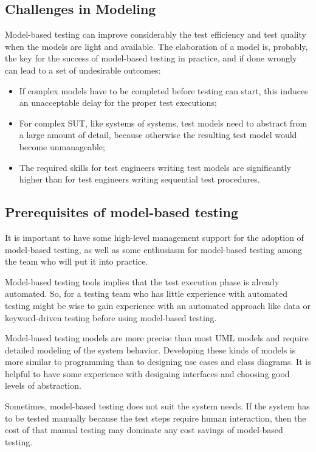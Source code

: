 \subsection{Challenges in Modeling}
Model-based testing can improve considerably the test 
efficiency and test quality when the models are light 
and available. The elaboration of a model is, probably, 
the key for the success of model-based testing in practice,
and if done wrongly~\cite{Peleska.2013} can lead to a set of undesirable 
outcomes:

\begin{itemize}
\item If complex models have to be completed before testing
can start, this induces an unacceptable delay for the
proper test executions;
\item For complex SUT, like systems of systems, test models 
need to abstract from a large amount of detail, because 
otherwise the resulting test model would become unmanageable;
\item The required skills for test engineers writing test 
models are significantly higher than for test engineers 
writing sequential test procedures.
\end{itemize}

\subsection{Prerequisites of model-based testing}

It is important to have some high-level management support for the adoption of model-based testing, as well as some enthusiasm for model-based testing among the team who will put it into practice.

Model-based testing tools implies that the test execution phase is already automated. So, for a testing team who has little experience with automated testing might be wise to gain experience with an automated approach like data or keyword-driven testing before using model-based testing.

Model-based testing models are more precise than most UML models and require detailed modeling of the system behavior. Developing these kinds of models is more similar to programming than to designing use cases and class diagrams. It is helpful to have some experience with designing interfaces and choosing good levels of abstraction.

Sometimes, model-based testing does not suit the system needs. If the system has to be tested manually because the test steps require human interaction, then the cost of that manual testing may dominate any cost savings of model-based testing.


